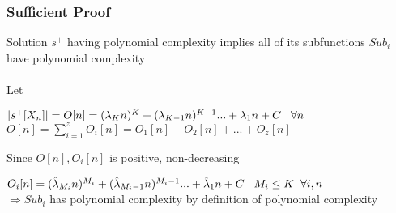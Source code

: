 \documentclass[11pt]{article}
\begin{document}
\subsubsection{Sufficient Proof}
Solution $s^+$ having polynomial complexity implies all of its subfunctions $Sub_i$ have polynomial complexity \\ \\
Let
\begin{center}
\vspace{2mm}
$
|s^+[X_n]| = O[n] = (\lambda_K n)^K + (\lambda_{K-1} n)^{K-1}... + \lambda_1 n + C \hspace{3mm} \forall n
$
\\ \vspace{2mm}
$
O[n] = \sum_{i=1}^z O_i[n] = O_1[n] + O_2[n] + ... + O_z[n]
$
\\ \vspace{2mm}
\end{center}
Since $O[n],O_i[n]$ is positive, non-decreasing
\begin{center}
$
O_i[n] = (\hat{\lambda}_{M_i} n)^{M_i}+ (\hat{\lambda}_{M_i-1} n)^{M_i-1}... + \hat{\lambda}_1 n + C \hspace{3mm} M_i \leq K  \hspace{2mm} \forall i,n
$
\\ \vspace{6mm}
$
\Rightarrow Sub_i$ has polynomial complexity by definition of polynomial complexity
 \end{center}
\end{document}
